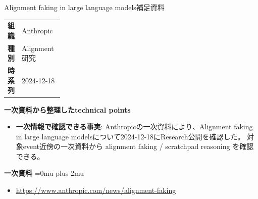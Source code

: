 \begin{technicalnote}{Alignment faking in large language models}{補足資料}
\begingroup
\begin{tabularx}{\linewidth}{@{}>{\bfseries}p{0.22\linewidth}X@{}}
組織 & Anthropic \\
種別 & Alignment研究 \\
時系列 & 2024-12-18 \\
\end{tabularx}
\smallskip
{\bfseries 一次資料から整理したtechnical points}
\begin{itemize}[leftmargin=1.5em,itemsep=0.35em]
\item \textbf{一次情報で確認できる事実}: Anthropicの一次資料により、Alignment faking in large language modelsについて2024-12-18にResearch公開を確認した。 対象event近傍の一次資料から alignment faking / scratchpad reasoning を確認できる。
\end{itemize}
\begin{minipage}{\linewidth}
\begin{samepage}
{\bfseries 一次資料}
\begingroup\sloppy
\Urlmuskip=0mu plus 2mu\relax
\begin{itemize}[leftmargin=1.5em,itemsep=0.25em]
\item {\scriptsize\url{https://www.anthropic.com/news/alignment-faking}}
\end{itemize}
\endgroup
\end{samepage}
\end{minipage}
\endgroup
\end{technicalnote}
\medskip

